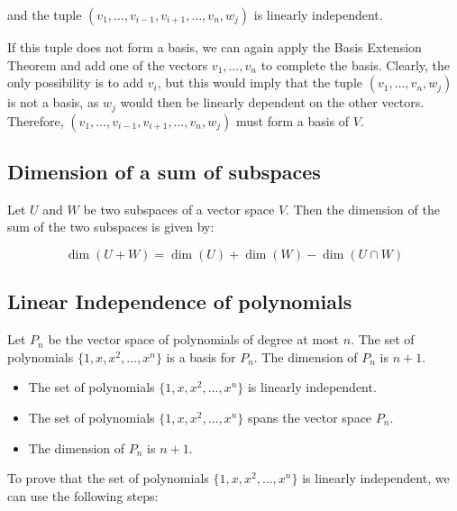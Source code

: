 and the tuple \((v_1, \ldots, v_{i-1}, v_{i+1}, \ldots, v_n, w_j)\) is linearly independent.

If this tuple does not form a basis, we can again apply the Basis Extension Theorem 
and add one of the vectors \(v_1, \ldots, v_n\) to complete the basis. Clearly, the only possibility is 
to add \(v_i\), but this would imply that the tuple \((v_1, \ldots, v_n, w_j)\) is not a basis, as 
\(w_j\) would then be linearly dependent on the other vectors. 
Therefore, \((v_1, \ldots, v_{i-1}, v_{i+1}, \ldots, v_n, w_j)\) must form a basis of \(V\).

\QED

\subsection{Dimension of a sum of subspaces}

Let \(U\) and \(W\) be two subspaces of a vector space \(V\). Then the dimension of the sum of the two 
subspaces is given by:

\[
    \dim(U + W) = \dim(U) + \dim(W) - \dim(U \cap W)    
\]

\subsection{Linear Independence of polynomials}

Let \(P_n\) be the vector space of polynomials of degree at most \(n\). The set of polynomials 
\(\{1, x, x^2, \ldots, x^n\}\) is a basis for \(P_n\).
The dimension of \(P_n\) is \(n + 1\).

\begin{itemize}

	\item The set of polynomials \(\{1, x, x^2, \ldots, x^n\}\) is linearly independent.

	\item The set of polynomials \(\{1, x, x^2, \ldots, x^n\}\) spans the vector space \(P_n\).

	\item The dimension of \(P_n\) is \(n + 1\).

\end{itemize}

To prove that the set of polynomials \(\{1, x, x^2, \ldots, x^n\}\) is linearly independent, 
we can use the following steps:

